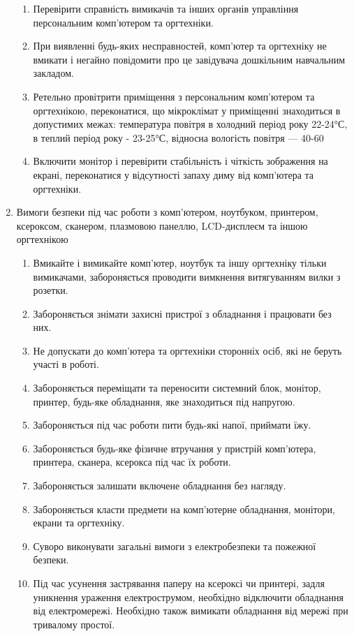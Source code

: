 \begin{enumerate}
\begin{enumerate}
        \item Перевірити справність вимикачів та інших органів управління персональним комп'ютером та оргтехніки.
        \item При виявленні будь-яких несправностей, комп'ютер та оргтехніку не вмикати і негайно повідомити про це завідувача дошкільним навчальним закладом.
        \item Ретельно провітрити приміщення з персональним комп'ютером та оргтехнікою, переконатися, що мікроклімат у приміщенні знаходиться в допустимих межах: температура повітря в холодний період року 22-24°С, в теплий період року - 23-25°С, відносна вологість повітря — 40-60%
        \item Включити монітор і перевірити стабільність і чіткість зображення на екрані, переконатися у відсутності запаху диму від комп'ютера та оргтехніки.
    \end{enumerate}
    \item Вимоги безпеки під час роботи з комп'ютером, ноутбуком, принтером, ксероксом, сканером, плазмовою панеллю, LCD-дисплеєм та іншою оргтехнікою
    \begin{enumerate}
        \item Вмикайте і вимикайте комп'ютер, ноутбук та іншу оргтехніку тільки вимикачами, забороняється проводити вимкнення витягуванням вилки з розетки.
        \item Забороняється знімати захисні пристрої з обладнання і працювати без них.
        \item Не допускати до комп'ютера та оргтехніки сторонніх осіб, які не беруть участі в роботі.
        \item Забороняється переміщати та переносити системний блок, монітор, принтер, будь-яке обладнання, яке знаходиться під напругою.
        \item Забороняється під час роботи пити будь-які напої, приймати їжу.
        \item Забороняється будь-яке фізичне втручання у пристрій комп'ютера, принтера, сканера, ксерокса під час їх роботи.
        \item Забороняється залишати включене обладнання без нагляду.
        \item Забороняється класти предмети на комп'ютерне обладнання, монітори, екрани та оргтехніку.
        \item Суворо виконувати загальні вимоги з електробезпеки та пожежної безпеки.
        \item Під час усунення застрявання паперу на ксероксі чи принтері, задля уникнення ураження електрострумом, необхідно відключити обладнання від електромережі. Необхідно також вимикати обладнання від мережі при тривалому простої.

\end{enumerate}
\end{enumerate}

